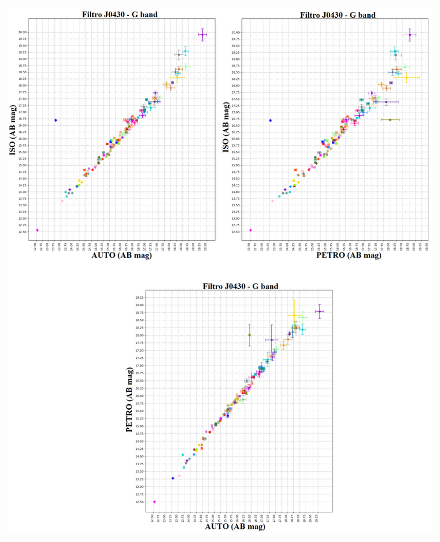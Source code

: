 \begin{anexosenv}
    \begin{figure}[h]
        \centering
        \includegraphics[width=1.0\textwidth]{Imagens/J0430_iso_auto.png}
        \caption[]{}
        \label{fig:J0430_iso_auto} 
    \end{figure}


\end{anexosenv}
